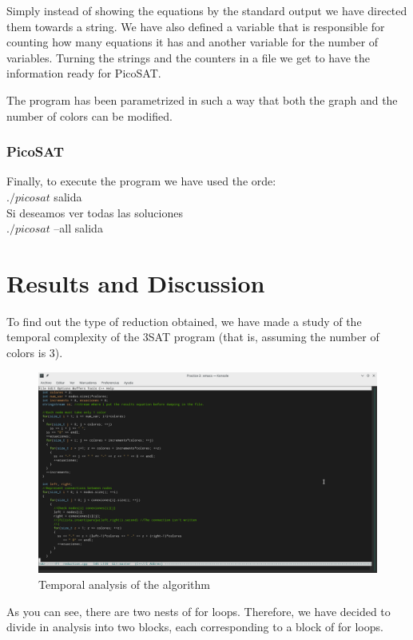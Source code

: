 \documentclass{article}
\begin{document}
        Simply instead of showing the equations by the standard output we have directed them towards a string. 
        We have also defined a variable that is responsible for counting how many equations it has and another 
        variable for the number of variables. Turning the strings and the counters in a file we get to have the information ready 
        for PicoSAT.

        The program has been parametrized in such a way that both the graph and the number of colors can be modified.  
    
    \subsubsection{PicoSAT}
        Finally, to execute the program we have used the orde: \\
         \vspace{5mm} $./picosat$ salida \\

        Si deseamos ver todas las soluciones \\
         \vspace{5mm} $./picosat$ --all salida


\section{Results and Discussion}
    To find out the type of reduction obtained, we have made a study of the temporal complexity 
    of the 3SAT program (that is, assuming the number of colors is 3). 
    \begin{figure}[H]
        \centering
        \includegraphics[width=1\textwidth]{pictures/analisis.png}
        \caption{Temporal analysis of the algorithm}
    \end{figure}
    As you can see, there are two nests of for loops. Therefore, we have decided to 
    divide in analysis into two blocks, each corresponding to a block of for loops. 
\end{document}
